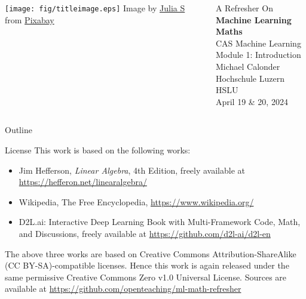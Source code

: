 \documentclass[9pt,aspectratio=169,xcolor=dvipsnames]{beamer}
\begin{document}
\begin{frame}
    \begin{columns}[onlytextwidth]
        \begin{column}{0.4\textwidth}
            \vspace*{10mm}
            \texttt{[image: fig/titleimage.eps]}
            {\tiny Image by \href{https://pixabay.com/users/julia_s-4109630/}{Julia S} from
                \href{https://pixabay.com}{Pixabay}}
        \end{column}
        \begin{column}{0.6\textwidth}
            \flushright
            {A Refresher On}\\[1mm]
            {\Huge \textbf{Machine Learning Maths}}\\[15mm]
            {\Large CAS Machine Learning}\\[1mm]
            {\Large Module 1: Introduction}\\[15mm]
            Michael Calonder\\[1mm]
            Hochschule Luzern HSLU\\[1mm]
            {April 19 \& 20, 2024}\\
        \end{column}
    \end{columns}
\end{frame}

\begin{frame}{Outline}
    \tableofcontents
\end{frame}






% 
% 

\begin{frame}{License}
    \small
    This work is based on the following works:
    \begin{itemize}
        \item Jim Hefferson, \emph{Linear Algebra}, 4th Edition, freely available at \url{https://hefferon.net/linearalgebra/}
        \item Wikipedia, The Free Encyclopedia, \url{https://www.wikipedia.org/}
        \item D2L.ai: Interactive Deep Learning Book with Multi-Framework Code, Math, and Discussions, freely available at \url{https://github.com/d2l-ai/d2l-en}
    \end{itemize}

    The above three works are based on Creative Commons Attribution-ShareAlike (CC BY-SA)-compatible licenses. Hence this work is again released under
    the same permissive Creative Commons Zero v1.0 Universal License. Sources are available at \url{https://github.com/openteaching/ml-math-refresher}
\end{frame}
\end{document}
